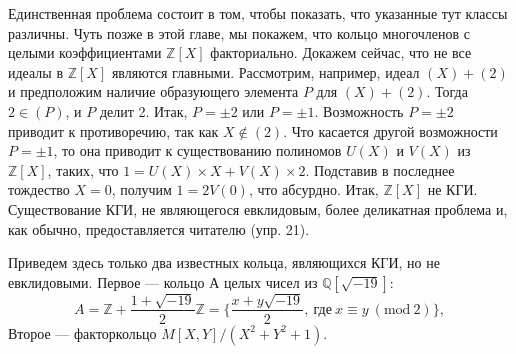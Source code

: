 \documentclass{mai_book}
\begin{document}
\begin{myproof}
Единственная проблема состоит в том, чтобы показать, что  
указанные тут классы различны. Чуть позже в этой главе, мы покажем, 
что кольцо многочленов с целыми коэффициентами $\mathbb{Z}[X]$  
факториально. Докажем сейчас, что не все идеалы в $\mathbb{Z}[X]$ являются  
главными. Рассмотрим, например, идеал $(X) + (2)$ и предположим наличие 
образующего элемента $P$ для $(X) + (2)$. Тогда $2 \in (P)$, и $P$ делит 2. 
Итак, $P = ±2$ или $P = ±1$. Возможность $P = ±2$ приводит к 
противоречию, так как $X \notin (2)$. Что касается другой  
возможности $P = ±1$, то она приводит к существованию полиномов $U(X)$ 
и $V(X)$ из $\mathbb{Z}[X]$, таких, что $1 = U(X) \times X + V(X) \times 2$. Подставив 
в последнее тождество $X = 0$, получим $1 = 2V(0)$, что абсурдно. 
Итак, $\mathbb{Z}[X]$ не КГИ. Существование КГИ, не являющегося  
евклидовым, более деликатная проблема и, как обычно, предоставляется 
читателю (упр. 21).

\noindent Приведем здесь только два известных кольца, являющихся КГИ, но 
не евклидовыми. Первое — кольцо $А$ целых чисел из $\mathbb{Q}[\sqrt{-19}]$:
\begin{equation*}
A = \mathbb{Z} + \frac{1 + \sqrt{-19}}{2}\mathbb{Z} = \{{\frac{x+y\sqrt{-19}}{2},\: \text{где}\: x \equiv y\: (\text{mod}\: 2)}\},
\end{equation*} 
Второе — факторкольцо $M[X, Y]\slash(X^2 + Y^2 + 1)$. 
\end{myproof}
\end{document}
